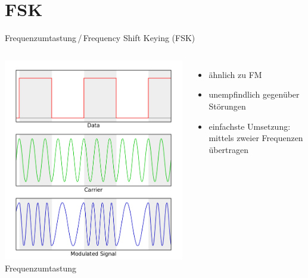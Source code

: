 \section{FSK}
\begin{frame}{Frequenzumtastung\,/\,Frequency Shift Keying (FSK)}
  \begin{columns}
    \includegraphics[width=\textwidth,height=.8\textheight,keepaspectratio]{a15/Fsk.png}\\
    {\tiny Frequenzumtastung \hyperlink{refs}{\cite{wm}}}
    \begin{itemize}
      \item ähnlich zu FM
      \item unempfindlich gegenüber Störungen
      \item einfachste Umsetzung: mittels zweier Frequenzen übertragen
    \end{itemize}
  \end{columns}
\end{frame}

